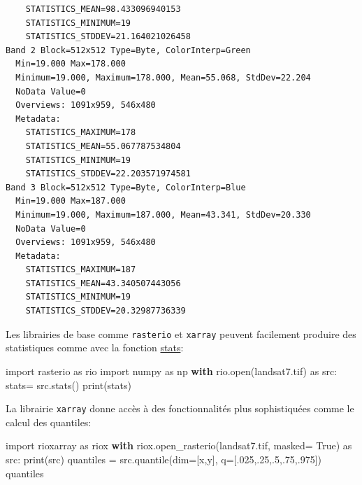 \documentclass[
  11pt,
  letterpaper,
  open=any,
  twoside=false,
  french]{scrbook}
\newenvironment{Shaded}{\begin{snugshade}}{\end{snugshade}}
\newcommand{\BuiltInTok}[1]{\textcolor[rgb]{0.00,0.23,0.31}{#1}}
\newcommand{\ControlFlowTok}[1]{\textcolor[rgb]{0.00,0.23,0.31}{\textbf{#1}}}
\newcommand{\FloatTok}[1]{\textcolor[rgb]{0.68,0.00,0.00}{#1}}
\newcommand{\ImportTok}[1]{\textcolor[rgb]{0.00,0.46,0.62}{#1}}
\newcommand{\NormalTok}[1]{\textcolor[rgb]{0.00,0.23,0.31}{#1}}
\newcommand{\OperatorTok}[1]{\textcolor[rgb]{0.37,0.37,0.37}{#1}}
\newcommand{\StringTok}[1]{\textcolor[rgb]{0.13,0.47,0.30}{#1}}
\newcommand{\VariableTok}[1]{\textcolor[rgb]{0.07,0.07,0.07}{#1}}
\begin{document}
\begin{verbatim}
    STATISTICS_MEAN=98.433096940153
    STATISTICS_MINIMUM=19
    STATISTICS_STDDEV=21.164021026458
Band 2 Block=512x512 Type=Byte, ColorInterp=Green
  Min=19.000 Max=178.000 
  Minimum=19.000, Maximum=178.000, Mean=55.068, StdDev=22.204
  NoData Value=0
  Overviews: 1091x959, 546x480
  Metadata:
    STATISTICS_MAXIMUM=178
    STATISTICS_MEAN=55.067787534804
    STATISTICS_MINIMUM=19
    STATISTICS_STDDEV=22.203571974581
Band 3 Block=512x512 Type=Byte, ColorInterp=Blue
  Min=19.000 Max=187.000 
  Minimum=19.000, Maximum=187.000, Mean=43.341, StdDev=20.330
  NoData Value=0
  Overviews: 1091x959, 546x480
  Metadata:
    STATISTICS_MAXIMUM=187
    STATISTICS_MEAN=43.340507443056
    STATISTICS_MINIMUM=19
    STATISTICS_STDDEV=20.32987736339
\end{verbatim}

Les librairies de base comme \texttt{rasterio} et \texttt{xarray}
peuvent facilement produire des statistiques comme avec la fonction
\href{https://rasterio.readthedocs.io/en/stable/api/rasterio.io.html\#rasterio.io.BufferedDatasetWriter.stats}{stats}:

\begin{Shaded}
\begin{Highlighting}[]
\ImportTok{import}\NormalTok{ rasterio }\ImportTok{as}\NormalTok{ rio}
\ImportTok{import}\NormalTok{ numpy }\ImportTok{as}\NormalTok{ np}
\ControlFlowTok{with}\NormalTok{ rio.}\BuiltInTok{open}\NormalTok{(}\StringTok{\textquotesingle{}landsat7.tif\textquotesingle{}}\NormalTok{) }\ImportTok{as}\NormalTok{ src:}
\NormalTok{    stats}\OperatorTok{=}\NormalTok{ src.stats()}
    \BuiltInTok{print}\NormalTok{(stats)}
\end{Highlighting}
\end{Shaded}

La librairie \texttt{xarray} donne accès à des fonctionnalités plus
sophistiquées comme le calcul des quantiles:

\begin{Shaded}
\begin{Highlighting}[]
\ImportTok{import}\NormalTok{ rioxarray }\ImportTok{as}\NormalTok{ riox}
\ControlFlowTok{with}\NormalTok{ riox.open\_rasterio(}\StringTok{\textquotesingle{}landsat7.tif\textquotesingle{}}\NormalTok{, masked}\OperatorTok{=} \VariableTok{True}\NormalTok{) }\ImportTok{as}\NormalTok{ src:}
    \BuiltInTok{print}\NormalTok{(src)}
\NormalTok{quantiles }\OperatorTok{=}\NormalTok{ src.quantile(dim}\OperatorTok{=}\NormalTok{[}\StringTok{\textquotesingle{}x\textquotesingle{}}\NormalTok{,}\StringTok{\textquotesingle{}y\textquotesingle{}}\NormalTok{], q}\OperatorTok{=}\NormalTok{[}\FloatTok{.025}\NormalTok{,}\FloatTok{.25}\NormalTok{,}\FloatTok{.5}\NormalTok{,}\FloatTok{.75}\NormalTok{,}\FloatTok{.975}\NormalTok{])}
\NormalTok{quantiles}
\end{Highlighting}
\end{Shaded}
\end{document}
